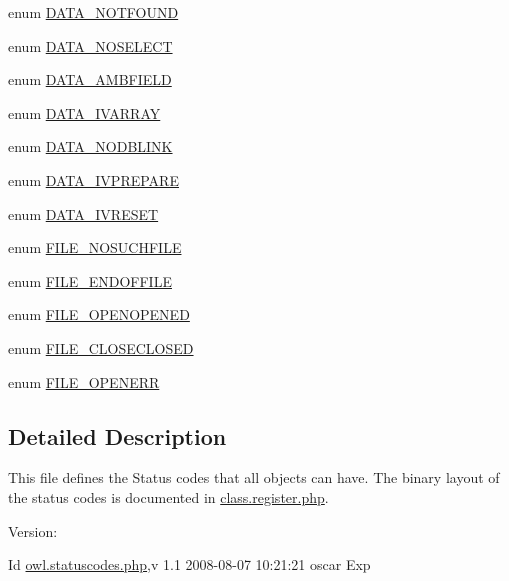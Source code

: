 \begin{Indent}{\bf }\par
\begin{CompactItemize}
\item 
enum \hyperlink{owl_8statuscodes_8php_1b3920489f064605aec419c2f18a43c6}{DATA\_\-NOTFOUND} 
\item 
enum \hyperlink{owl_8statuscodes_8php_d2b2ac63774859fb01412dcf1d416a30}{DATA\_\-NOSELECT} 
\item 
enum \hyperlink{owl_8statuscodes_8php_4567c5a928f00431e3c61ed317494ad1}{DATA\_\-AMBFIELD} 
\item 
enum \hyperlink{owl_8statuscodes_8php_de36d7efad634ceb46de1b6670e6af08}{DATA\_\-IVARRAY} 
\item 
enum \hyperlink{owl_8statuscodes_8php_f5b9acbc941403d2077e28968a8ad3fc}{DATA\_\-NODBLINK} 
\item 
enum \hyperlink{owl_8statuscodes_8php_ef494323f427edd5668413ba3ae3e4c0}{DATA\_\-IVPREPARE} 
\item 
enum \hyperlink{owl_8statuscodes_8php_86d2cc4775b7b6282502b36048984a24}{DATA\_\-IVRESET} 
\end{CompactItemize}
\end{Indent}
\begin{Indent}{\bf }\par
\begin{CompactItemize}
\item 
enum \hyperlink{owl_8statuscodes_8php_a5abc6e073dcb61147f56d7854983787}{FILE\_\-NOSUCHFILE} 
\item 
enum \hyperlink{owl_8statuscodes_8php_c0e1f657ef7713fe45084b10af74670b}{FILE\_\-ENDOFFILE} 
\item 
enum \hyperlink{owl_8statuscodes_8php_3abc0dabe8ead6f76dd62c3e2b506af7}{FILE\_\-OPENOPENED} 
\item 
enum \hyperlink{owl_8statuscodes_8php_ce4541108274f542d69d8fa4523e13f6}{FILE\_\-CLOSECLOSED} 
\item 
enum \hyperlink{owl_8statuscodes_8php_d540d25f34464adfbce1258d9a37fe3f}{FILE\_\-OPENERR} 
\end{CompactItemize}
\end{Indent}


\subsection{Detailed Description}
This file defines the Status codes that all objects can have. The binary layout of the status codes is documented in \hyperlink{class_8register_8php}{class.register.php}. \begin{Desc}
\item[Version:]\end{Desc}
\begin{Desc}
\item[Id]\hyperlink{owl_8statuscodes_8php}{owl.statuscodes.php},v 1.1 2008-08-07 10:21:21 oscar Exp \end{Desc}


